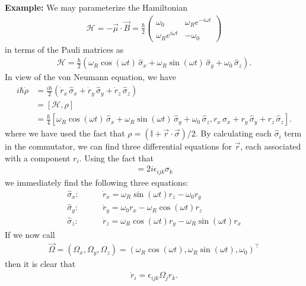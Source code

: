 \documentclass{book}
\theoremstyle{definition}
\newcommand{\ham}{\mathcal{H}}
\newcommand{\f}[2]{\frac{#1}{#2}}
\newcommand{\lp}{\left(}
\newcommand{\rp}{\right)}
\begin{document}
\noindent \textbf{Example:} We may parameterize the Hamiltonian
\begin{align*}
	\ham = -\vec{\mu} \cdot \vec{B} = \f{\hbar}{2}\begin{pmatrix}
		\omega_0 & \omega_R e^{-i\omega t} \\ \omega_R e^{i\omega t} & -\omega_0
	\end{pmatrix}
\end{align*}
in terms of the Pauli matrices as 
\begin{align*}
	\ham = \f{\hbar}{2}\lp 
	\omega_R \cos(\omega t) \, \hat \sigma_x + 
	\omega_R \sin(\omega t) \, \hat \sigma_y + 
	\omega_0 \, \hat\sigma_z \rp.
\end{align*}
In view of the von Neumann equation, we have
\begin{align*}
	i\hbar \dot \rho &= \f{i\hbar}{2} (\dot r_x \,\hat\sigma_x + \dot r_y \,\hat\sigma_y + \dot r_z \,\hat\sigma_z ) \\
	&= [\ham, \rho] \\
	&= \f{\hbar}{4}[\omega_R \cos(\omega t) \, \hat \sigma_x + 
	\omega_R \sin(\omega t) \, \hat \sigma_y + 
	\omega_0 \, \hat\sigma_z , r_x\,\hat\sigma_x + r_y \, \hat \sigma_y + r_z \, \hat \sigma_z].
\end{align*}
where we have used the fact that $\rho = (\mathbb{I} + \vec{r}\cdot \vec{\sigma})/2$. By calculating each $\hat \sigma_i$ term in the commutator, we can find three differential equations for $\vec{r}$, each associated with a component $r_i$. Using the fact that
\begin{align*}
	[\sigma_i, \sigma_j] = 2i \epsilon_{ijk} \sigma_k
\end{align*}
we immediately find the following three equations:
\begin{align*}
	\hat \sigma_x : &\quad\quad \dot r_x = \omega_R \sin(\omega t) r_z - \omega_0 r_y \\
	\hat \sigma_y : &\quad\quad \dot r_y = \omega_0 r_x - \omega_R \cos(\omega t) r_z \\
	\hat \sigma_z : &\quad\quad \dot r_z = \omega_R \cos(\omega t) r_y - \omega_R \sin(\omega t) r_x
\end{align*}
If we now call
\begin{align*}
	\vec{\Omega} = (\Omega_x, \Omega_y, \Omega_z)  =(\omega_R \cos(\omega t), \omega_R \sin(\omega t), \omega_0)^\top
\end{align*}
then it is clear that
\begin{align*}
	\dot r_i = \epsilon_{ijk} \Omega_j r_k.
\end{align*}
\end{document}

